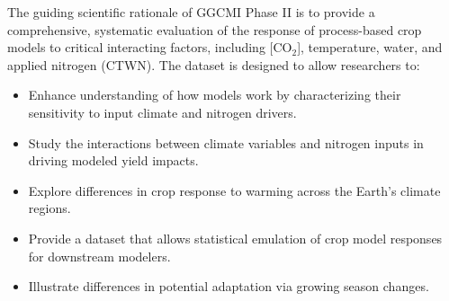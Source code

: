 \documentclass[gmd, manuscript]{copernicus} %
\begin{document}
The guiding scientific rationale of GGCMI Phase II is to provide a comprehensive, systematic evaluation of the response of process-based crop models to critical interacting factors, including [CO$_2$], temperature, water, and applied nitrogen (CTWN). 
The dataset is designed to allow researchers to:
\begin{itemize}
    \item Enhance understanding of how models work by characterizing their sensitivity to input climate and nitrogen drivers.
    \item Study the interactions between climate variables and nitrogen inputs in driving modeled yield impacts. 
    \item Explore differences in crop response to warming across the Earth's climate regions.
    \item Provide a dataset that allows statistical emulation of crop model responses for downstream modelers.
    \item Illustrate differences in potential adaptation via growing season changes. 
\end{itemize}
\vspace{-0.05in}
\end{document}
